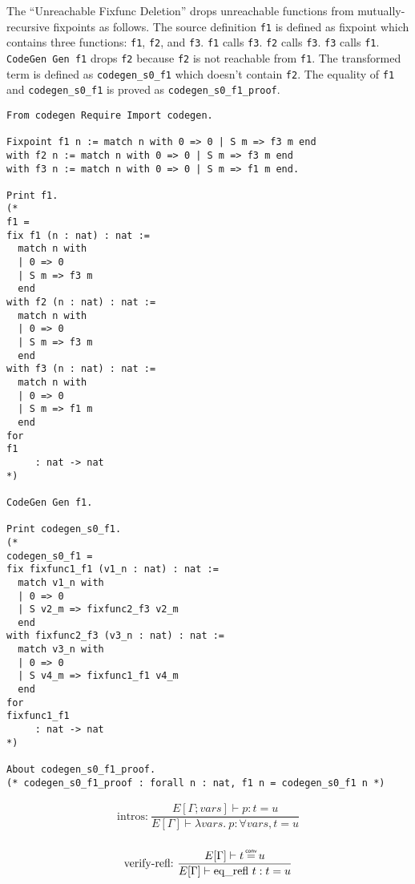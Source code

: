 \documentclass[a4paper,fleqn]{article}
\newcommand\eqconv{\mathrel{\overset{\makebox[0pt]{\mbox{\normalfont\tiny\sffamily conv}}}{=}}}
\newcommand{\lam}[2]{\lambda #1.\:#2}
\newcommand{\breakrule}{\\[0.5em]}
\begin{document}
The ``Unreachable Fixfunc Deletion'' drops unreachable functions from mutually-recursive fixpoints as follows.
The source definition \lstinline!f1! is defined as fixpoint which contains three functions: \lstinline!f1!, \lstinline!f2!, and \lstinline!f3!.
\lstinline!f1! calls \lstinline!f3!.
\lstinline!f2! calls \lstinline!f3!.
\lstinline!f3! calls \lstinline!f1!.
\lstinline!CodeGen Gen f1! drops \lstinline!f2! because \lstinline!f2! is not reachable from \lstinline!f1!.
The transformed term is defined as \lstinline!codegen_s0_f1! which doesn't contain \lstinline!f2!.
The equality of \lstinline!f1! and \lstinline!codegen_s0_f1! is proved as \lstinline!codegen_s0_f1_proof!.

\begin{lstlisting}
From codegen Require Import codegen.

Fixpoint f1 n := match n with 0 => 0 | S m => f3 m end
with f2 n := match n with 0 => 0 | S m => f3 m end
with f3 n := match n with 0 => 0 | S m => f1 m end.

Print f1.
(*
f1 =
fix f1 (n : nat) : nat :=
  match n with
  | 0 => 0
  | S m => f3 m
  end
with f2 (n : nat) : nat :=
  match n with
  | 0 => 0
  | S m => f3 m
  end
with f3 (n : nat) : nat :=
  match n with
  | 0 => 0
  | S m => f1 m
  end
for
f1
     : nat -> nat
*)

CodeGen Gen f1.

Print codegen_s0_f1.
(*
codegen_s0_f1 =
fix fixfunc1_f1 (v1_n : nat) : nat :=
  match v1_n with
  | 0 => 0
  | S v2_m => fixfunc2_f3 v2_m
  end
with fixfunc2_f3 (v3_n : nat) : nat :=
  match v3_n with
  | 0 => 0
  | S v4_m => fixfunc1_f1 v4_m
  end
for
fixfunc1_f1
     : nat -> nat
*)

About codegen_s0_f1_proof.
(* codegen_s0_f1_proof : forall n : nat, f1 n = codegen_s0_f1 n *)
\end{lstlisting}


\begin{gather*}
  \text{intros:}~
    \dfrac{
      E[\Gamma; \mathit{vars}] \vdash p : t = u
    }{
      E[\Gamma] \vdash \lam{\mathit{vars}}{p} : \forall \mathit{vars}, t = u
    } \breakrule
\end{gather*}

\begin{gather*}
  \text{verify-refl:}~
    \dfrac{
      E[\Gamma] \vdash t \eqconv u
    }{
      E[\Gamma] \vdash \mbox{eq\_refl}~t : t = u
    } \breakrule
\end{gather*}
\end{document}
